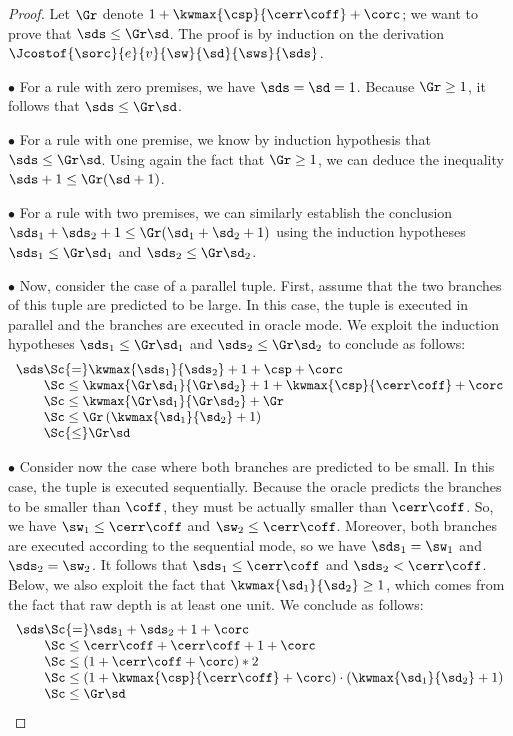 \begin{proof}

\newcommand{\cspp}{\Gr} Let $\cspp$ denote
$1+\kwmax{\csp}{\cerr\coff}+\corc$; we want to  prove that $\sds \leq
\cspp\sd$.  The proof is by induction on the derivation 
$\Jcostof{\sorc}{ e }{v}{\sw}{\sd}{\sws}{\sds}$.

$\bullet$  For a rule with zero premises, we have $\sds = \sd = 1$.
Because $\cspp \geq 1$, it follows that $\sds \leq \cspp\sd$.

$\bullet$  For a rule with one premise, we know by induction hypothesis that
$\sds \leq \cspp\sd$.
Using again the fact that $\cspp \geq 1$, 
we can deduce the inequality $\sds+1 \leq \cspp(\sd+1)$.

$\bullet$ For a rule with two premises, we can similarly establish
the conclusion $\sds_1+\sds_2+1 \leq \cspp(\sd_1+\sd_2+1)$ using 
the induction hypotheses 
$\sds_1 \leq \cspp \sd_1$ and $\sds_2 \leq \cspp \sd_2$.

$\bullet$  Now, consider the case of a parallel tuple.
First, assume that the two branches of this tuple
are predicted to be large.
In this case, the tuple is executed in parallel and the
branches are executed in oracle mode.
We exploit the induction hypotheses
$\sds_1 \leq \cspp \sd_1$ and $\sds_2 \leq \cspp \sd_2$
to conclude as follows:
%
$$\begin{array}{l@{}l}
\sds & \Sc{=} \kwmax{\sds_1}{\sds_2} + 1 + \csp + \corc \\
& \Sc\leq \kwmax{ \cspp\sd_1 }{ \cspp\sd_2 } + 1+\kwmax{\csp}{\cerr\coff}+\corc \\
& \Sc\leq \kwmax{ \cspp\sd_1 }{ \cspp\sd_2 } + \cspp \\
& \Sc\leq  \cspp\, (\kwmax{ \sd_1 }{ \sd_2 } + 1) \\
& \Sc{\leq}  \cspp\sd
\end{array}$$

$\bullet$  Consider now the case where both branches are predicted
to be small. In this case, the tuple is executed sequentially.
Because the oracle predicts the branches to be smaller
than $\coff$, they must be actually smaller than $\cerr\coff$.
So, we have $\sw_1 \leq \cerr\coff$ and $\sw_2 \leq \cerr\coff$.
Moreover, both branches are executed according to the sequential mode,
so we have $\sds_1 = \sw_1$ and $\sds_2 = \sw_2$. 
It follows that $\sds_1 \leq \cerr\coff$ and $\sds_2 < \cerr\coff$.
Below, we also exploit the fact that 
$\kwmax{ \sd_1 }{ \sd_2 } \geq 1$, which comes from the
fact that raw depth is at least one unit.
We conclude as follows:
%
$$\begin{array}{l@{}l}
\sds & \Sc{=} \sds_1 + \sds_2 + 1 + \corc \\
& \Sc\leq \cerr\coff + \cerr\coff + 1 + \corc \\
& \Sc\leq  (1+\cerr\coff+\corc)*2 \\
& \Sc\leq  (1+\kwmax{\csp}{\cerr\coff}+\corc)\cdot(\kwmax{ \sd_1 }{ \sd_2 } + 1) \\
& \Sc\leq  \cspp\sd
\end{array}$$


\end{proof}
